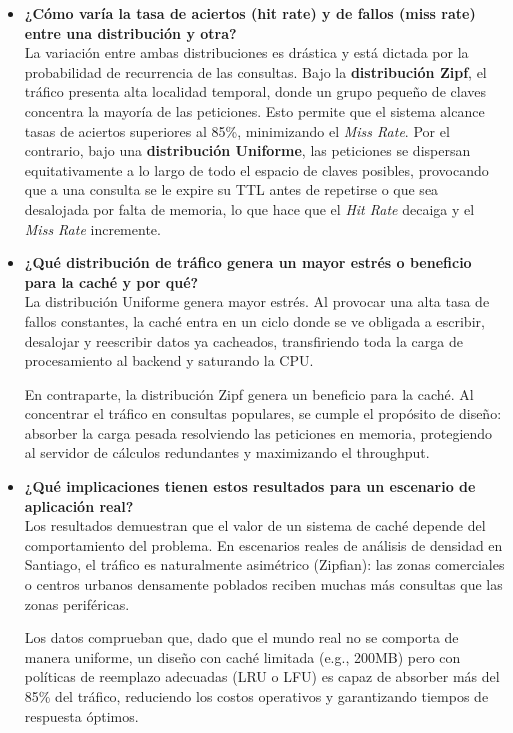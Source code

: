 \documentclass[letter,12pt]{article}
\begin{document}
\begin{itemize}
    \item \textbf{¿Cómo varía la tasa de aciertos (hit rate) y de fallos (miss rate) entre una distribución y otra?}\\
    La variación entre ambas distribuciones es drástica y está dictada por la probabilidad de
    recurrencia de las consultas. Bajo la \textbf{distribución Zipf}, el tráfico presenta alta
    localidad temporal, donde un grupo pequeño de claves concentra la mayoría de las peticiones.
    Esto permite que el sistema alcance tasas de aciertos superiores al 85\%, minimizando el
    \textit{Miss Rate}. Por el contrario, bajo una \textbf{distribución Uniforme}, las peticiones
    se dispersan equitativamente a lo largo de todo el espacio de claves posibles, provocando que
    a una consulta se le expire su TTL antes de repetirse o que sea desalojada por falta de
    memoria, lo que hace que el \textit{Hit Rate} decaiga y el \textit{Miss Rate} incremente.

    \item \textbf{¿Qué distribución de tráfico genera un mayor estrés o beneficio para la caché y por qué?}\\
    La distribución Uniforme genera mayor estrés. Al provocar una alta tasa de fallos constantes,
    la caché entra en un ciclo donde se ve obligada a escribir, desalojar y reescribir datos ya
    cacheados, transfiriendo toda la carga de procesamiento al backend y saturando la CPU.

    En contraparte, la distribución Zipf genera un beneficio para la caché. Al concentrar el
    tráfico en consultas populares, se cumple el propósito de diseño: absorber la carga pesada
    resolviendo las peticiones en memoria, protegiendo al servidor de cálculos redundantes y
    maximizando el throughput.

    \item \textbf{¿Qué implicaciones tienen estos resultados para un escenario de aplicación real?}\\
    Los resultados demuestran que el valor de un sistema de caché depende del comportamiento del
    problema. En escenarios reales de análisis de densidad en Santiago, el tráfico es naturalmente
    asimétrico (Zipfian): las zonas comerciales o centros urbanos densamente poblados reciben
    muchas más consultas que las zonas periféricas.

    Los datos comprueban que, dado que el mundo real no se comporta de manera uniforme, un diseño
    con caché limitada (e.g., 200MB) pero con políticas de reemplazo adecuadas (LRU o LFU) es
    capaz de absorber más del 85\% del tráfico, reduciendo los costos operativos y garantizando
    tiempos de respuesta óptimos.
\end{itemize}
\end{document}
